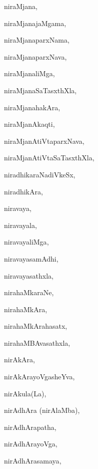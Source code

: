 \begin{multicols}{3}
{\noindent
{niraMjana}, \pageref{niraMjana}

\noindent
{niraMjanajaMgama}, \pageref{niraMjanajaMgama}

\noindent
{niraMjanaparxNama}, \pageref{niraMjanaparxNama}

\noindent
{niraMjanaparxNava}, \pageref{niraMjanaparxNava}

\noindent
{niraMjanaliMga}, \pageref{niraMjanaliMga}

\noindent
{niraMjanaSaTasxthXla}, \pageref{niraMjanaSaTasxthXla}

\noindent
{niraMjanahakAra}, \pageref{niraMjanahakAra}

\noindent
{niraMjanAkaqti}, \pageref{niraMjanAkaqti}

\noindent
{niraMjanAtiVtaparxNava}, \pageref{niraMjanAtiVtaparxNava}

\noindent
{niraMjanAtiVtaSaTasxthXla}, \pageref{niraMjanAtiVtaSaTasxthXla}

\noindent
{niradhikaraNadiVkeSx}, \pageref{niradhikaraNadiVkeSx}

\noindent
{niradhikAra}, \pageref{niradhikAra}

\noindent
{niravaya}, \pageref{niravaya}

\noindent
{niravayala}, \pageref{niravayala}

\noindent
{niravayaliMga}, \pageref{niravayaliMga}

\noindent
{niravayasamAdhi}, \pageref{niravayasamAdhi}

\noindent
{niravayasathxla}, \pageref{niravayasathxla}

\noindent
{nirahaMkaraNe}, \pageref{nirahaMkaraNe}

\noindent
{nirahaMkAra}, \pageref{nirahaMkAra}

\noindent
{nirahaMkArahasatx}, \pageref{nirahaMkArahasatx}

\noindent
{nirahaMBAvasathxla}, \pageref{nirahaMBAvasathxla}

\noindent
{nirAkAra}, \pageref{nirAkAra}

\noindent
{nirAkArayoVgasheYva}, \pageref{nirAkArayoVgasheYva}

\noindent
{nirAkula(La)}, \pageref{nirAkulaLa}

\noindent
{nirAdhAra (nirAlaMba)}, \pageref{nirAdhAra nirAlaMba}

\noindent
{nirAdhArapatha}, \pageref{nirAdhArapatha}

\noindent
{nirAdhArayoVga}, \pageref{nirAdhArayoVga}

\noindent
{nirAdhArasamaya}, \pageref{nirAdhArasamaya}

}
\end{multicols}
